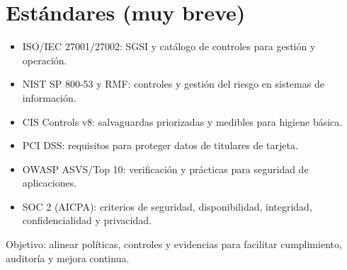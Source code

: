 \documentclass[11pt,a4paper]{article}
\begin{document}
    \section{Estándares (muy breve)}
    \begin{itemize}
        \item ISO/IEC 27001/27002: SGSI y catálogo de controles para gestión y operación.
        \item NIST SP 800-53 y RMF: controles y gestión del riesgo en sistemas de información.
        \item CIS Controls v8: salvaguardas priorizadas y medibles para higiene básica.
        \item PCI DSS: requisitos para proteger datos de titulares de tarjeta.
        \item OWASP ASVS/Top 10: verificación y prácticas para seguridad de aplicaciones.
        \item SOC 2 (AICPA): criterios de seguridad, disponibilidad, integridad, confidencialidad y privacidad.
    \end{itemize}
    Objetivo: alinear políticas, controles y evidencias para facilitar cumplimiento, auditoría y mejora continua.
\end{document}
